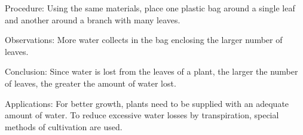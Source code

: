 \begin{multicols}{2}
\begin{description*}
\item[Procedure:]{Using the same materials, place one plastic bag around a single leaf and
another around a branch with many leaves.}
\item[Observations:]{More water collects in the bag enclosing the larger number of leaves.}
\item[Conclusion:]{Since water is lost from the leaves of a plant, the larger the number of leaves, the
greater the amount of water lost.}
\item[Applications:]{For better growth, plants need to be supplied with an adequate amount of water.
To reduce excessive water losses by transpiration, special methods of cultivation are used.}
\end{description*}

%
%

\vfill
\pagebreak




\end{multicols}


